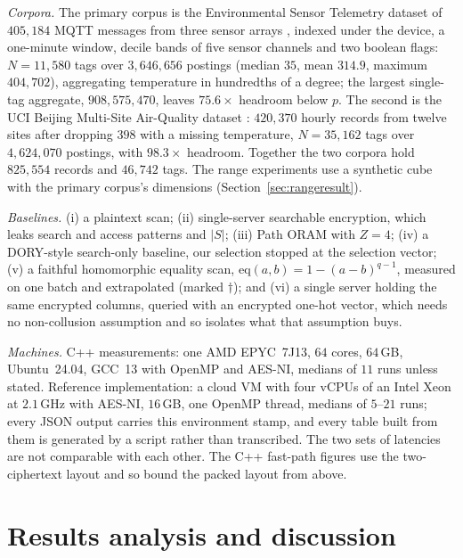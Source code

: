 \documentclass[a4paper,fleqn]{cas-sc}
\begin{document}
\emph{Corpora.} The primary corpus is the Environmental Sensor Telemetry
dataset of $405{,}184$ MQTT messages from three sensor arrays
\citep{stafford_2020_environmental}, indexed under the device, a one-minute
window, decile bands of five sensor channels and two boolean flags:
$N=11{,}580$ tags over $3{,}646{,}656$ postings (median $35$, mean $314.9$,
maximum $404{,}702$), aggregating temperature in hundredths of a degree;
the largest single-tag aggregate, $908{,}575{,}470$, leaves $75.6\times$
headroom below $p$. The second is the UCI Beijing Multi-Site Air-Quality
dataset \citep{zhang2017cautionary,chen2019beijing}: $420{,}370$ hourly records
from twelve sites after dropping $398$ with a missing temperature, $N=35{,}162$
tags over $4{,}624{,}070$ postings, with $98.3\times$ headroom. Together the two
corpora hold $825{,}554$ records and $46{,}742$ tags. The range experiments use a synthetic cube with the primary corpus's
dimensions (Section~\ref{sec:rangeresult}).

\emph{Baselines.} (i) a plaintext scan; (ii) single-server searchable
encryption, which leaks search and access patterns and $|S|$; (iii) Path ORAM
with $Z=4$; (iv) a DORY-style \citep{dory} search-only baseline, our selection
stopped at the selection vector; (v) a faithful homomorphic equality scan,
$\mathrm{eq}(a,b)=1-(a-b)^{q-1}$, measured on one batch and extrapolated (marked
$\dagger$); and (vi) a single server holding the same encrypted columns,
queried with an encrypted one-hot vector, which needs no non-collusion
assumption and so isolates what that assumption buys.

\emph{Machines.} C++ measurements: one AMD EPYC~7J13, $64$ cores, $64$\,GB,
Ubuntu~24.04, GCC~13 with OpenMP and AES-NI, medians of $11$ runs unless
stated. Reference implementation: a cloud VM with
four vCPUs of an Intel Xeon at $2.1$\,GHz with AES-NI, $16$\,GB, one OpenMP
thread, medians of $5$--$21$ runs; every JSON output carries this environment
stamp, and every table built from them is generated by a script rather than
transcribed. The two sets of latencies are not comparable with each other. The
C++ fast-path figures use the two-ciphertext layout and so bound the packed
layout from above.

\section{Results analysis and discussion}
\label{sec:resultsdisc}
\end{document}
